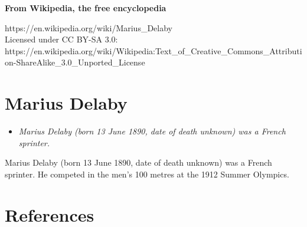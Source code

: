 \textbf{From Wikipedia, the free encyclopedia}

https://en.wikipedia.org/wiki/Marius\_Delaby\\
Licensed under CC BY-SA 3.0:\\
https://en.wikipedia.org/wiki/Wikipedia:Text\_of\_Creative\_Commons\_Attribution-ShareAlike\_3.0\_Unported\_License

\section{Marius Delaby}\label{marius-delaby}

\begin{itemize}
\item
  \emph{Marius Delaby (born 13 June 1890, date of death unknown) was a
  French sprinter.}
\end{itemize}

Marius Delaby (born 13 June 1890, date of death unknown) was a French
sprinter. He competed in the men's 100 metres at the 1912 Summer
Olympics.

\section{References}\label{references}
